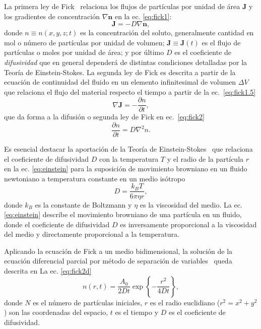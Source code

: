\documentclass{article}[13pt]
\begin{document}
La primera ley de Fick~\cite{gilExperimentosFisicaUsando2014} relaciona los flujos de partículas por unidad de área $\mathbf{J}$ y los gradientes de concentración $\nabla \mathbf{n}$ en la ec. \ref{eq:fick1}:
\begin{equation}
    \mathbf{J} = -D \nabla \mathbf{n},
    \label{eq:fick1}
\end{equation}
donde $n\equiv n(x,y,z;t)$ es la concentración del soluto, generalmente cantidad en mol o número de partículas por unidad de volumen; $\mathbf{J}\equiv\mathbf{J}(t)$ es el flujo de partículas o moles por unidad de área; y por último $D$ es el coeficiente de \textit{difusividad} que en general dependerá de distintas condiciones  detalladas por la Teoría de Einstein-Stokes.
La segunda ley de Fick es descrita a partir de la ecuación de continuidad del fluido en un elemento infinitesimal de volumen $\Delta V$ que relaciona el flujo del material respecto el tiempo a partir de la ec.~\ref{eq:fick1.5}
\begin{equation}
    \nabla \mathbf{J} = -\frac{\partial n}{\partial t},
    \label{eq:fick1.5}
\end{equation}
que da forma a la difusión o segunda ley de Fick en ec.~\ref{eq:fick2}
\begin{equation}
    \frac{\partial n}{\partial t} = D \nabla^2 n.
    \label{eq:fick2}
\end{equation}

Es esencial destacar la aportación de la Teoría de Einstein-Stokes~\cite{einsteinUberMolekularkinetischenTheorie1905} que relaciona el coeficiente de difusividad $D$ con la temperatura $T$ y el radio de la partícula $r$ en la ec. \ref{eq:einstein} para la suposición de movimiento browniano en un fluido newtoniano a temperatura constante en un medio isótropo~\cite{leeInkDifussionWater2004}
\begin{equation}
    D = \frac{k_B T}{6 \pi \eta r},
    \label{eq:einstein}
\end{equation}
donde $k_B$ es la constante de Boltzmann y $\eta$ es la viscosidad del medio. La ec. \ref{eq:einstein} describe el movimiento browniano de una partícula en un fluido, donde el coeficiente de difusividad $D$ es inversamente proporcional a la viscosidad del medio y directamente proporcional a la temperatura.

Aplicando la ecuación de Fick a un medio bidimensional, la solución de la ecuación diferencial parcial por método de separación de variables~\cite{gilExperimentosFisicaUsando2014} queda descrita en La ec. \ref{eq:fick2d}
\begin{equation}
    n(r,t) = \frac{A_0}{2 D t} \exp{\left\{-\frac{r^2}{4Dt}\right\}},
    \label{eq:fick2d}
\end{equation}
donde $N$ es el número de partículas iniciales, $r$ es el radio euclidiano ($r^2 = x^2 + y^2$) son las coordenadas del espacio, $t$ es el tiempo y $D$ es el coeficiente de difusividad. 





\end{document}
